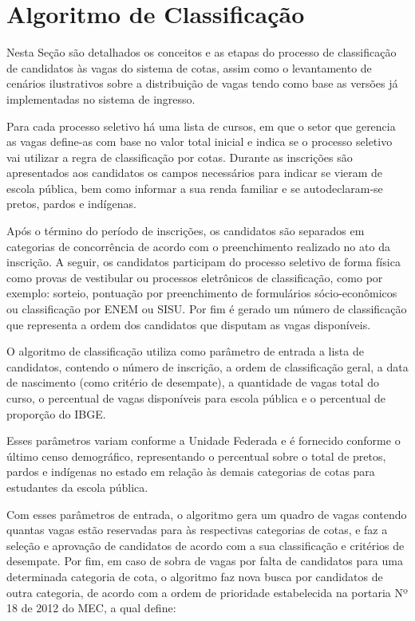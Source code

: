 \section{Algoritmo de Classificação}
\label{algoritimodeclassificacao}

Nesta Seção são detalhados os conceitos e as etapas do processo de classificação de candidatos às vagas do sistema de cotas, assim como o levantamento de cenários ilustrativos sobre a distribuição de vagas tendo como base as versões já implementadas no sistema de ingresso.

Para cada processo seletivo há uma lista de cursos, em que o setor que gerencia as vagas define-as com base no valor total inicial e indica se o processo seletivo vai utilizar a regra de classificação por cotas. Durante as inscrições são apresentados aos candidatos os campos necessários para indicar se vieram de escola pública, bem como informar a sua renda familiar e se autodeclaram-se pretos, pardos e indígenas.

Após o término do período de inscrições, os candidatos são separados em categorias de concorrência de acordo com o preenchimento realizado no ato da inscrição. A seguir, os candidatos participam do processo seletivo de forma física como provas de vestibular ou processos eletrônicos de classificação, como por exemplo: sorteio, pontuação por preenchimento de formulários sócio-econômicos ou classificação por \gls{ENEM} ou \gls{SISU}. Por fim é gerado um número de classificação que representa a ordem dos candidatos que disputam as vagas disponíveis.

O algoritmo de classificação utiliza como parâmetro de entrada a lista de candidatos, contendo o número de inscrição, a ordem de classificação geral, a data de nascimento (como critério de desempate), a quantidade de vagas total do curso, o percentual de vagas disponíveis para escola pública e o percentual de proporção do \gls{IBGE}.

Esses parâmetros variam conforme a Unidade Federada e é fornecido conforme o último censo demográfico, representando o percentual sobre o total de pretos, pardos e indígenas no estado em relação às demais categorias de cotas para estudantes da escola pública.

Com esses parâmetros de entrada, o algoritmo gera um quadro de vagas contendo quantas vagas estão reservadas para às respectivas categorias de cotas, e faz a seleção e aprovação de candidatos de acordo com a sua classificação e critérios de desempate. Por fim, em caso de sobra de vagas por falta de candidatos para uma determinada categoria de cota, o algoritmo faz nova busca por candidatos de outra categoria, de acordo com a ordem de prioridade estabelecida na portaria Nº 18 de 2012 do \gls{MEC}, a qual define:

